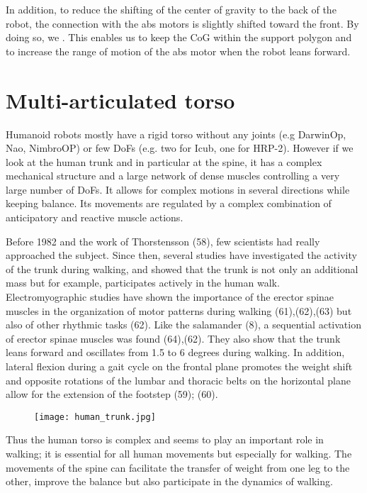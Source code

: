 In addition, to reduce the shifting of the center of gravity to the back of the robot, the connection with the abs motors is slightly shifted toward the front. By doing so, we .
This enables us to keep the CoG within the support polygon and to increase the range of motion of the abs motor when the robot leans forward.


\section{Multi-articulated torso} %

Humanoid robots mostly have a rigid torso without any joints (e.g DarwinOp, Nao, NimbroOP) or few DoFs (e.g. two for Icub, one for HRP-2). However if we look at the human trunk and in particular at the spine, it has a complex mechanical structure and a large network of dense muscles controlling a very large number of DoFs. It allows for complex motions in several directions while keeping balance. Its movements are regulated by a complex combination of anticipatory and reactive muscle actions.

Before 1982 and the work of Thorstensson (58), few scientists had really approached the subject. Since then, several studies have investigated the activity of the trunk during walking, and showed that the trunk is not only an additional mass but for example, participates actively in the human walk.
Electromyographic studies have shown the importance of the erector spinae muscles in the organization of motor patterns during walking (61),(62),(63) but also of other rhythmic tasks (62). Like the salamander (8), a sequential activation of erector spinae muscles was found (64),(62).
They also show that the trunk leans forward and oscillates from 1.5 to 6 degrees during walking. In addition, lateral flexion during a gait cycle on the frontal plane promotes the weight shift and opposite rotations of the lumbar and thoracic belts on the horizontal plane allow for the extension of the footstep (59); (60).

\begin{figure}[ht]
    \begin{center}
        \texttt{[image: human\_trunk.jpg]}
    \end{center}
    \caption{}
    \label{fig:human_spine_system}
\end{figure}

Thus the human torso is complex and seems to play an important role in walking; it is essential for all human movements but especially for walking. The movements of the spine can facilitate the transfer of weight from one leg to the other, improve the balance but also participate in the dynamics of walking.

